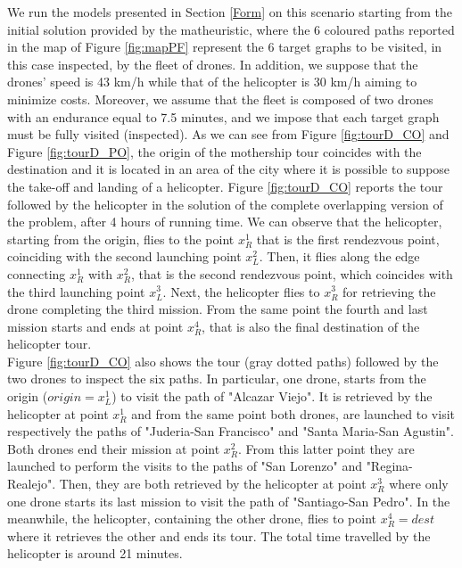 \documentclass[10pt,a4paper]{elsarticle}
\newcommand{\EN}[1]{{\color{black}#1}}
\begin{document}
\noindent
We run the models presented in Section \ref{Form} on this scenario starting from the initial solution provided by the matheuristic, where the 6 coloured paths reported in the map of Figure \ref{fig:mapPF} represent the 6 target graphs to be visited, in this case inspected, by the fleet of drones. In addition, we suppose that the drones' speed is 43 km/h while that of the helicopter is  30 km/h aiming to minimize costs.
Moreover, we assume that the fleet is composed \EN{of} two drones with an endurance equal to 7.5 minutes, and we impose that each target graph must be fully visited (inspected).  As we can see from Figure \ref{fig:tourD_CO} and Figure \ref{fig:tourD_PO}, the origin of the mothership tour coincides with the destination and it is located in an area of the city where it is possible to \EN{suppose} the take-off and landing of \EN{a} helicopter. Figure \ref{fig:tourD_CO} reports the tour followed by the helicopter in the solution of the complete overlapping version of the problem, after 4 hours of running time. We can observe that the helicopter, starting from the origin, flies to the point $x_R^1$ that is the first rendezvous point, coinciding with the second launching point $x_L^2$. Then, it flies along the edge connecting $x_R^1$ with $x_R^2$, that is the second rendezvous point, which coincides with the third launching point $x_L^3$. Next, the helicopter flies to $x_R^3$ for retrieving the \EN{drone completing the third mission}. From the same point the fourth and last mission starts and ends at point $x_R^4$, that is also the final destination of the helicopter tour.\\
Figure \ref{fig:tourD_CO} also shows the tour (gray dotted paths) followed by the two drones \EN{to inspect} the six paths. In particular, one drone, starts from the origin ($origin=x_L^1$) \EN{to visit} the path of "Alcazar Viejo". It is retrieved by the helicopter at point $x_R^1$ and from the same point both drones, are launched to visit respectively the paths of "Juderia-San Francisco" and "Santa Maria-San Agustin". Both drones end their mission at point $x_R^2$. From this latter point they are launched to perform the visits to the paths of "San Lorenzo" and "Regina-Realejo". Then, they are both retrieved by the  helicopter at point $x_R^3$ where only one drone starts its last mission to visit the path of "Santiago-San Pedro". In the meanwhile, the helicopter, containing the other drone, flies to point $x_R^4=dest$ where it retrieves the other and ends its tour.
The total time travelled by the helicopter is around 21 minutes.
\end{document}
